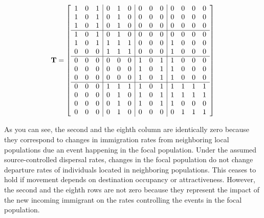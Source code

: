 \begin{equation}
{\bf T} = 
\left[ \begin{array}{ccc|ccc|ccc|cccc}
1 & 0 & 1  & 0 & 1 & 0  & 0 & 0 & 0  & 0 & 0 & 0 & 0 \\
1 & 0 & 1  & 0 & 1 & 0  & 0 & 0 & 0  & 0 & 0 & 0 & 0 \\
1 & 0 & 1  & 0 & 1 & 0  & 0 & 0 & 0  & 0 & 0 & 0 & 0 \\
\hline
1 & 0 & 1  & 0 & 1 & 0  & 0 & 0 & 0  & 0 & 0 & 0 & 0 \\
1 & 0 & 1  & 1 & 1 & 1  & 0 & 0 & 0  & 1 & 0 & 0 & 0 \\
0 & 0 & 0  & 1 & 1 & 1  & 0 & 0 & 0  & 1 & 0 & 0 & 0 \\
\hline
0 & 0 & 0  & 0 & 0 & 0  & 1 & 0 & 1  & 1 & 0 & 0 & 0 \\
0 & 0 & 0  & 0 & 0 & 0  & 1 & 0 & 1  & 1 & 0 & 0 & 0 \\
0 & 0 & 0  & 0 & 0 & 0  & 1 & 0 & 1  & 1 & 0 & 0 & 0 \\
\hline
0 & 0 & 0  & 1 & 1 & 1  & 1 & 0 & 1  & 1 & 1 & 1 & 1 \\
0 & 0 & 0  & 0 & 1 & 0  & 1 & 0 & 1  & 1 & 1 & 1 & 1 \\
0 & 0 & 0  & 0 & 1 & 0  & 1 & 0 & 1  & 1 & 0 & 0 & 0 \\
0 & 0 & 0  & 0 & 1 & 0  & 0 & 0 & 0  & 0 & 1 & 1 & 1 \\
\end{array}
\right]
\label{T_E}
\end{equation}

As you can see, the second and the eighth column are identically zero because they correspond to changes in immigration rates from neighboring local populations due an event happening in the focal population. Under the assumed source-controlled dispersal rates, changes in the focal population do not change departure rates of individuals located in neighboring populations. This ceases to hold if movement depends on destination occupancy or attractiveness. However, the second and the eighth rows are not zero because they represent the impact of the new incoming immigrant on the rates controlling the events in the focal population.  

